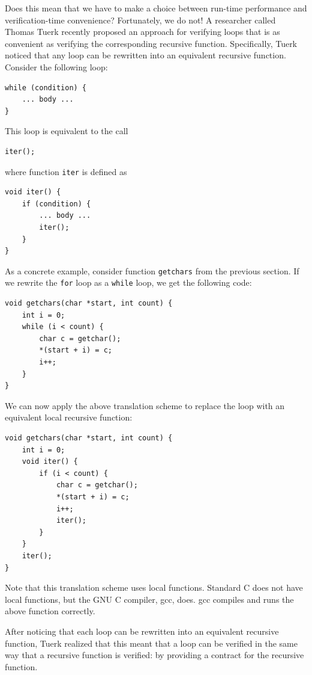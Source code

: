 \documentclass{article}
\begin{document}
Does this mean that we have to make a choice between run-time performance and verification-time convenience? Fortunately, we do not! A researcher called
Thomas Tuerk recently proposed an approach for verifying loops that is as convenient as verifying the corresponding recursive function. Specifically,
Tuerk noticed that any loop can be rewritten into an equivalent recursive function. Consider the following loop:
\begin{lstlisting}
while (condition) {
    ... body ...
}
\end{lstlisting}
This loop is equivalent to the call
\begin{lstlisting}
iter();
\end{lstlisting}
where function \lstinline!iter! is defined as
\begin{lstlisting}
void iter() {
    if (condition) {
        ... body ...
        iter();
    }
}
\end{lstlisting}
As a concrete example, consider function \lstinline!getchars! from the previous section. If we rewrite the \lstinline!for! loop as a \lstinline!while!
loop, we get the following code:
\begin{lstlisting}
void getchars(char *start, int count) {
    int i = 0;
    while (i < count) {
        char c = getchar();
        *(start + i) = c;
        i++;
    }
}
\end{lstlisting}
We can now apply the above translation scheme to replace the loop with an equivalent local recursive function:
\begin{lstlisting}
void getchars(char *start, int count) {
    int i = 0;
    void iter() {
        if (i < count) {
            char c = getchar();
            *(start + i) = c;
            i++;
            iter();
        }
    }
    iter();
}
\end{lstlisting}
Note that this translation scheme uses local functions. Standard C does not have local functions, but the GNU C compiler, gcc, does. gcc compiles
and runs the above function correctly.

After noticing that each loop can be rewritten into an equivalent recursive function, Tuerk realized that this meant that a loop can be verified
in the same way that a recursive function is verified: by providing a contract for the recursive function.
\end{document}

